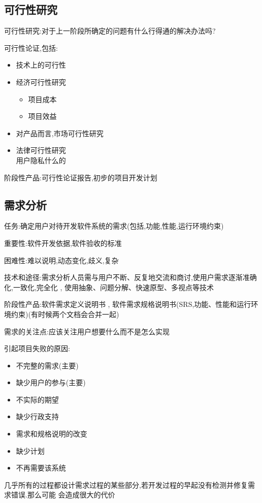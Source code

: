 \documentclass[UTF8,a4paper]{ctexart}
\begin{document}
\subsection{可行性研究}
可行性研究:对于上一阶段所确定的问题有什么行得通的解决办法吗?

可行性论证,包括:
\begin{itemize}
  \item 技术上的可行性
  \item 经济可行性研究
  \begin{itemize}
    \item 项目成本
    \item 项目效益
  \end{itemize}
  \item 对产品而言,市场可行性研究
  \item 法律可行性研究\\
  用户隐私什么的
\end{itemize}

阶段性产品:可行性论证报告,初步的项目开发计划

\subsection{需求分析}
任务:确定用户对待开发软件系统的需求(包括,功能,性能,运行环境约束)

重要性:软件开发依据,软件验收的标准

困难性:难以说明,动态变化,歧义,复杂

技术和途径:需求分析人员需与用户不断、反复地交流和商讨,使用户需求逐渐准确化,一致化,完全化 , 使用抽象、问题分解、快速原型、多视点等技术

阶段性产品:软件需求定义说明书 , 软件需求规格说明书(SRS,功能、性能和运行环境约束)(有时候两个文档会合并一起)

需求的关注点:应该关注用户想要什么而不是怎么实现

引起项目失败的原因:
\begin{itemize}
  \item 不完整的需求(主要)
  \item 缺少用户的参与(主要)
  \item 不实际的期望
  \item 缺少行政支持
  \item 需求和规格说明的改变
  \item 缺少计划
  \item 不再需要该系统
\end{itemize}

几乎所有的过程都设计需求过程的某些部分,若开发过程的早起没有检测并修复需求错误.那么可能
会造成很大的代价
\end{document}
